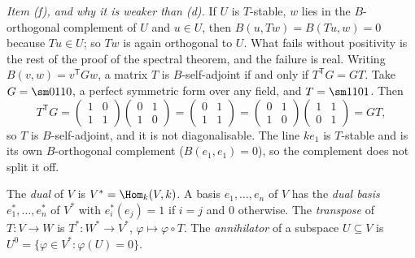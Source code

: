 \emph{Item (f), and why it is weaker than (d).} If $U$ is $T$-stable, $w$ lies in the
$B$-orthogonal complement of $U$ and $u\in U$, then $B(u,Tw)=B(Tu,w)=0$ because $Tu\in U$; so $Tw$ is
again orthogonal to $U$. What fails without positivity is the rest of the proof of the spectral
theorem, and the failure is real. Writing $B(v,w)=v^{\mathsf T}Gw$, a matrix $T$ is $B$-self-adjoint
if and only if $T^{\mathsf T}G=GT$. Take $G=\sm0110$, a perfect symmetric form over any field, and
$T=\sm1101$. Then
\[
T^{\mathsf T}G=\begin{pmatrix}1&0\\1&1\end{pmatrix}\begin{pmatrix}0&1\\1&0\end{pmatrix}
=\begin{pmatrix}0&1\\1&1\end{pmatrix}=\begin{pmatrix}0&1\\1&0\end{pmatrix}\begin{pmatrix}1&1\\0&1\end{pmatrix}=GT,
\]
so $T$ is $B$-self-adjoint, and it is not diagonalisable. The line $ke_1$ is $T$-stable and is its
own $B$-orthogonal complement ($B(e_1,e_1)=0$), so the complement does not split it off.

\begin{definition}\label{def:prereq:dual}
The \emph{dual} of $V$ is $V^*=\Hom_k(V,k)$. A basis $e_1,\dots,e_n$ of $V$ has the \emph{dual
basis} $e_1^*,\dots,e_n^*$ of $V^*$ with $e_i^*(e_j)=1$ if $i=j$ and $0$ otherwise. The
\emph{transpose} of $T\colon V\to W$ is $T^*\colon W^*\to V^*$, $\varphi\mapsto\varphi\circ T$. The
\emph{annihilator} of a subspace $U\subseteq V$ is $U^0=\{\varphi\in V^*:\varphi(U)=0\}$.
\end{definition}


